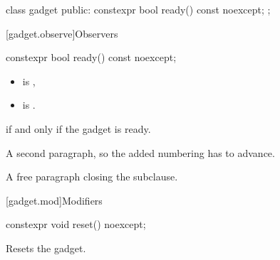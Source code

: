 \begin{addedblock}
\begin{codeblock}
class gadget {
public:
  constexpr bool ready() const noexcept;
};
\end{codeblock}

[gadget.observe]{Observers}

\begin{itemdecl}
constexpr bool ready() const noexcept;
\end{itemdecl}

\begin{itemdescr}
\pnum
\constraints
\begin{itemize}
\item {} is ,
\item {} is .
\end{itemize}

\pnum
\returns
{} if and only if the gadget is ready.

\pnum
A second paragraph, so the added numbering has to advance.
\end{itemdescr}

\pnum
A free paragraph closing the subclause.

[gadget.mod]{Modifiers}

\begin{itemdecl}
constexpr void reset() noexcept;
\end{itemdecl}

\begin{itemdescr}
\pnum
\effects
Resets the gadget.
\end{itemdescr}
\end{addedblock}
